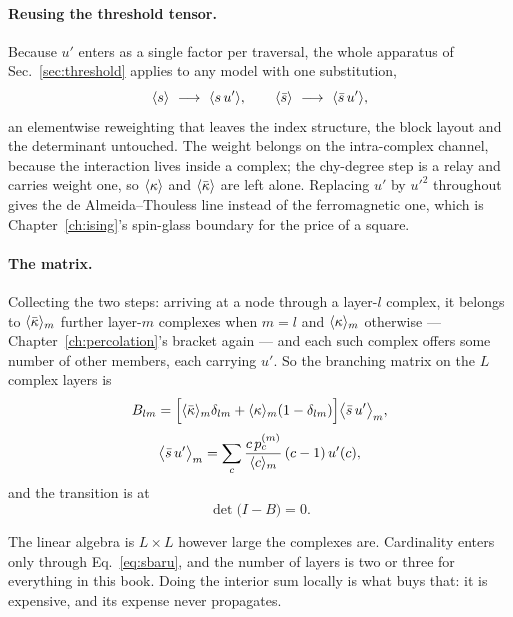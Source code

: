 \paragraph{Reusing the threshold tensor.} Because $u'$ enters as a single factor
per traversal, the whole apparatus of Sec.~\ref{sec:threshold} applies to any
model with one substitution,
\begin{equation}
  \ave{s}\ \longrightarrow\ \ave{s\,u'},
  \qquad
  \ave{\sbar}\ \longrightarrow\ \ave{\sbar\,u'},
  \label{eq:reweight}
\end{equation}
an elementwise reweighting that leaves the index structure, the block layout
and the determinant untouched. The weight belongs on the intra-complex channel,
because the interaction lives inside a complex; the chy-degree step is a relay
and carries weight one, so $\langle \kappa \rangle$ and $\langle \bar\kappa \rangle$ are left alone.
Replacing $u'$ by $u'^{2}$ throughout gives
the de Almeida--Thouless line instead of the ferromagnetic one, which is
Chapter~\ref{ch:ising}'s spin-glass boundary for the price of a square.

\paragraph{The matrix.} Collecting the two steps: arriving at a node through a
layer-$l$ complex, it belongs to $\langle \bar\kappa \rangle_{m}$ further layer-$m$ complexes
when $m=l$ and $\langle \kappa \rangle_{m}$ otherwise --- Chapter~\ref{ch:percolation}'s
bracket again --- and each such complex offers some number of other members,
each carrying $u'$. So the branching matrix on the $L$ complex layers is
\begin{equation}
  B_{lm}=\Bigl[\langle \bar\kappa \rangle_{m}\delta_{lm}
              +\langle \kappa \rangle_{m}(1-\delta_{lm})\Bigr]
         \bigl\langle \bar s\,u'\bigr\rangle_{m},
  \label{eq:branch}
\end{equation}
\begin{equation}
  \bigl\langle \bar s\,u'\bigr\rangle_{m}
    =\sum_{c}\frac{c\,p^{(m)}_{c}}{\langle c \rangle_{m}}\,(c-1)\,u'(c),
  \label{eq:sbaru}
\end{equation}
and the transition is at
\begin{equation}
  \det\bigl(I-B\bigr)=0.
  \label{eq:det}
\end{equation}

The linear algebra is $L\times L$ however large the complexes are. Cardinality
enters only through Eq.~\eqref{eq:sbaru}, and the number of layers is two or
three for everything in this book. Doing the interior sum locally is what buys
that: it is expensive, and its expense never propagates.

